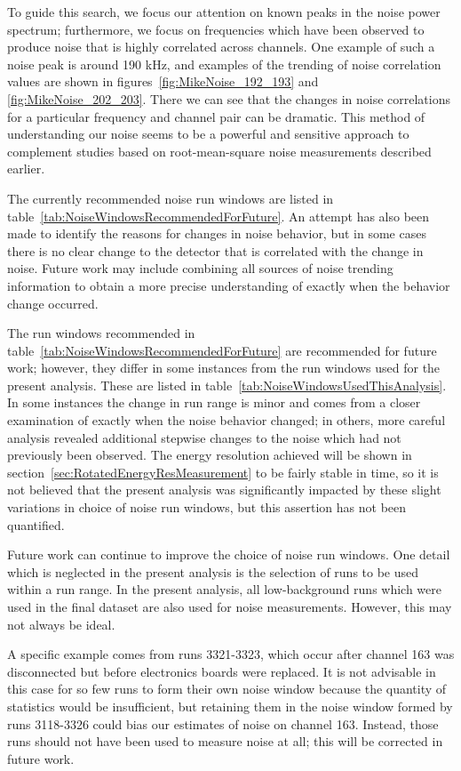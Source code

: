To guide this search, we focus our attention on known peaks in the noise power spectrum; furthermore, we focus on frequencies which have been observed to produce noise that is highly correlated across channels.  One example of such a noise peak is around 190 kHz, and examples of the trending of noise correlation values are shown in figures~\ref{fig:MikeNoise_192_193} and \ref{fig:MikeNoise_202_203}.  There we can see that the changes in noise correlations for a particular frequency and channel pair can be dramatic.  This method of understanding our noise seems to be a powerful and sensitive approach to complement studies based on root-mean-square noise measurements described earlier.

The currently recommended noise run windows are listed in table~\ref{tab:NoiseWindowsRecommendedForFuture}.  An attempt has also been made to identify the reasons for changes in noise behavior, but in some cases there is no clear change to the detector that is correlated with the change in noise.  Future work may include combining all sources of noise trending information to obtain a more precise understanding of exactly when the behavior change occurred.

The run windows recommended in table~\ref{tab:NoiseWindowsRecommendedForFuture} are recommended for future work; however, they differ in some instances from the run windows used for the present analysis.  These are listed in table~\ref{tab:NoiseWindowsUsedThisAnalysis}.  In some instances the change in run range is minor and comes from a closer examination of exactly when the noise behavior changed; in others, more careful analysis revealed additional stepwise changes to the noise which had not previously been observed.  The energy resolution achieved will be shown in section~\ref{sec:RotatedEnergyResMeasurement} to be fairly stable in time, so it is not believed that the present analysis was significantly impacted by these slight variations in choice of noise run windows, but this assertion has not been quantified.

Future work can continue to improve the choice of noise run windows.  One detail which is neglected in the present analysis is the selection of runs to be used within a run range.  In the present analysis, all low-background runs which were used in the final dataset are also used for noise measurements.  However, this may not always be ideal.

A specific example comes from runs 3321-3323, which occur after channel 163 was disconnected but before electronics boards were replaced.  It is not advisable in this case for so few runs to form their own noise window because the quantity of statistics would be insufficient, but retaining them in the noise window formed by runs 3118-3326 could bias our estimates of noise on channel 163.  Instead, those runs should not have been used to measure noise at all; this will be corrected in future work.

